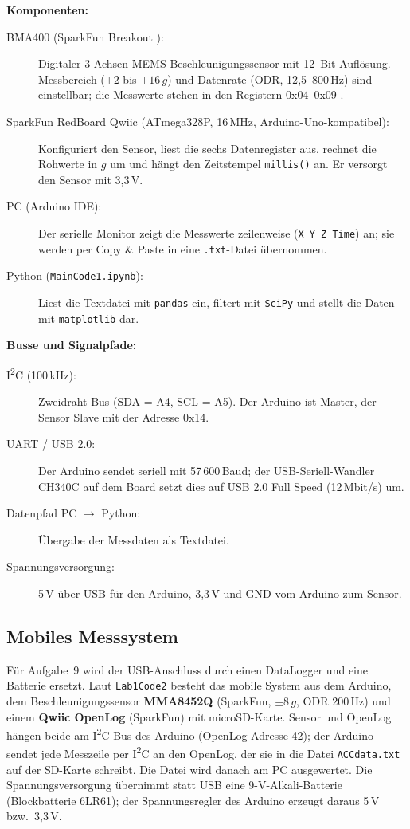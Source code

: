 \documentclass[a4paper,oneside,10pt]{article}
\begin{document}
\textbf{Komponenten:}
\begin{description}
    \item[BMA400 (SparkFun Breakout \cite{sparkfun}):] Digitaler 3-Achsen-MEMS-Beschleunigungssensor mit
    12~Bit Auflösung. Messbereich ($\pm 2$ bis $\pm 16\,g$) und Datenrate (ODR, 12{,}5--800\,Hz)
    sind einstellbar; die Messwerte stehen in den Registern 0x04--0x09 \cite{bma400}.
    \item[SparkFun RedBoard Qwiic (ATmega328P, 16\,MHz, Arduino-Uno-kompatibel):] Konfiguriert den Sensor, liest die sechs
    Datenregister aus, rechnet die Rohwerte in $g$ um und hängt den Zeitstempel
    \texttt{millis()} an. Er versorgt den Sensor mit 3{,}3\,V.
    \item[PC (Arduino IDE):] Der serielle Monitor zeigt die Messwerte zeilenweise
    (\texttt{X Y Z Time}) an; sie werden per Copy \& Paste in eine \texttt{.txt}-Datei
    übernommen.
    \item[Python (\texttt{MainCode1.ipynb}):] Liest die Textdatei mit \texttt{pandas} ein,
    filtert mit \texttt{SciPy} \cite{scipy} und stellt die Daten mit \texttt{matplotlib} dar.
\end{description}

\textbf{Busse und Signalpfade:}
\begin{description}
    \item[I\textsuperscript{2}C (100\,kHz):] Zweidraht-Bus (SDA = A4, SCL = A5). Der Arduino ist
    Master, der Sensor Slave mit der Adresse 0x14.
    \item[UART / USB 2.0:] Der Arduino sendet seriell mit 57\,600\,Baud; der USB-Seriell-Wandler
    CH340C auf dem Board setzt dies auf USB 2.0 Full Speed (12\,Mbit/s) um.
    \item[Datenpfad PC $\rightarrow$ Python:] Übergabe der Messdaten als Textdatei.
    \item[Spannungsversorgung:] 5\,V über USB für den Arduino, 3{,}3\,V und GND vom Arduino
    zum Sensor.
\end{description}

\subsection{Mobiles Messsystem}

Für Aufgabe~9 wird der USB-Anschluss durch einen DataLogger und eine Batterie
ersetzt. Laut \texttt{Lab1Code2} besteht das mobile System aus dem Arduino, dem
Beschleunigungssensor \textbf{MMA8452Q} (SparkFun, $\pm 8\,g$, ODR 200\,Hz) und
einem \textbf{Qwiic OpenLog} (SparkFun) mit microSD-Karte. Sensor und OpenLog hängen
beide am I\textsuperscript{2}C-Bus des Arduino (OpenLog-Adresse 42); der Arduino
sendet jede Messzeile per I\textsuperscript{2}C an den OpenLog, der sie in die Datei
\texttt{ACCdata.txt} auf der SD-Karte schreibt. Die Datei wird danach am PC
ausgewertet. Die Spannungsversorgung übernimmt statt USB eine 9-V-Alkali-Batterie
(Blockbatterie 6LR61); der Spannungsregler des Arduino erzeugt daraus 5\,V bzw.\ 3{,}3\,V.
\end{document}
